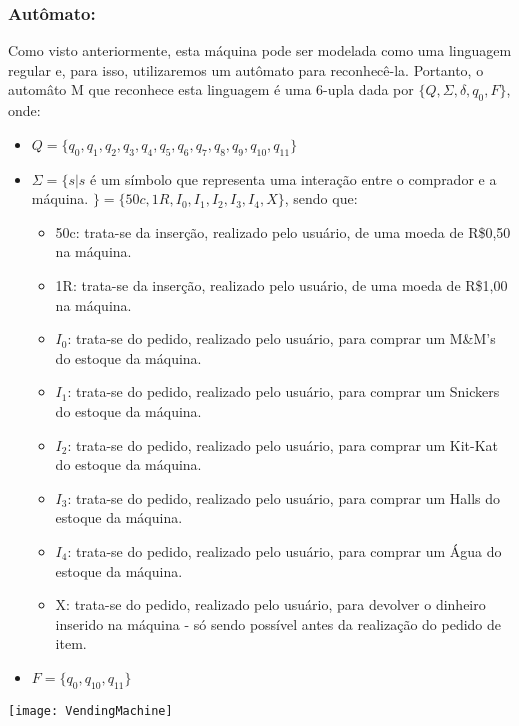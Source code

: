 \documentclass{article}
\begin{document}
\subsubsection*{Aut\^omato:}
\par Como visto anteriormente, esta m\'aquina pode ser modelada como uma linguagem regular e, para isso, utilizaremos um aut\^omato para reconhec\^e-la. Portanto, o autom\^ato M que reconhece esta linguagem \'e uma 6-upla dada por $\{Q, \Sigma, \delta, q_0, F\}$, onde:
\begin{itemize}
  \item $Q = \{ q_{0}, q_{1}, q_{2}, q_{3}, q_{4}, q_{5}, q_{6}, q_{7}, q_{8}, q_{9}, q_{10}, q_{11}\}$
  \item $\Sigma = \{ s | s$ \'e um s\'imbolo que representa uma intera\c{c}\~ao entre o comprador e a m\'aquina. $\} = \{ 50c, 1R, I_{0}, I_{1}, I_{2}, I_{3}, I_{4}, X\}$, sendo que:
        \begin{itemize}
          \item 50c: trata-se da inser\c{c}\~ao, realizado pelo usu\'ario, de uma moeda de R\$0,50 na m\'aquina.
          \item 1R: trata-se da inser\c{c}\~ao, realizado pelo usu\'ario, de uma moeda de R\$1,00 na m\'aquina.
          \item $I_{0}$: trata-se do pedido, realizado pelo usu\'ario, para comprar um M\&M's do estoque da m\'aquina.
          \item $I_{1}$: trata-se do pedido, realizado pelo usu\'ario, para comprar um Snickers do estoque da m\'aquina.
          \item $I_{2}$: trata-se do pedido, realizado pelo usu\'ario, para comprar um Kit-Kat do estoque da m\'aquina.
          \item $I_{3}$: trata-se do pedido, realizado pelo usu\'ario, para comprar um Halls do estoque da m\'aquina.
          \item $I_{4}$: trata-se do pedido, realizado pelo usu\'ario, para comprar um \'Agua do estoque da m\'aquina.
          \item X: trata-se do pedido, realizado pelo usu\'ario, para devolver o dinheiro inserido na m\'aquina - s\'o sendo poss\'ivel antes da realiza\c{c}\~ao do pedido de item.
        \end{itemize}
  \item $F = \{ q_{0}, q_{10}, q_{11} \}$
\end{itemize}

\texttt{[image: VendingMachine]}
\end{document}
